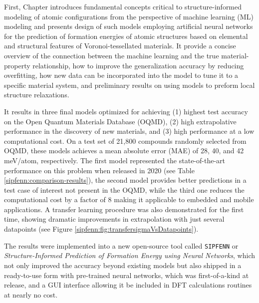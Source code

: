 First, Chapter  introduces fundamental concepts critical to structure-informed modeling of atomic configurations from the perspective of machine learning (ML) modeling and presents design of such models employing artificial neural networks for the prediction of formation energies of atomic structures based on elemental and structural features of Voronoi-tessellated materials. It provide a concise overview of the connection between the machine learning and the true material-property relationship, how to improve the generalization accuracy by reducing overfitting, how new data can be incorporated into the model to tune it to a specific material system, and preliminary results on using models to preform local structure relaxations.

It results in three final models optimized for achieving (1) highest test accuracy on the Open Quantum Materials Database (OQMD), (2) high extrapolative performance in the discovery of new materials, and (3) high performance at a low computational cost. On a test set of 21,800 compounds randomly selected from OQMD, these models achieves a mean absolute error (MAE) of 28, 40, and 42 meV/atom, respectively. The first model represented the state-of-the-art performance on this problem when released in 2020 \cite{Krajewski2020SIPFENNModels} (see Table \ref{sipfenn:comparison-results}), the second model provides better predictions in a test case of interest not present in the OQMD, while the third one reduces the computational cost by a factor of 8 making it applicable to embedded and mobile applications. A transfer learning procedure was also demonstrated for the first time, showing dramatic improvements in extrapolation with just several datapoints (see Figure \ref{sipfenn:fig:transfersigmaVsDatapoints}).

The results were implemented into a new open-source tool called \texttt{SIPFENN} or \textit{Structure-Informed Prediction of Formation Energy using Neural Networks}, which not only improved the accuracy beyond existing models but also shipped in a ready-to-use form with pre-trained neural networks, which was first-of-a-kind at release, and a GUI interface allowing it be included in DFT calculations routines at nearly no cost.


